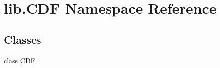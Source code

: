 \hypertarget{namespacelib_1_1_c_d_f}{\section{lib.\-C\-D\-F Namespace Reference}
\label{namespacelib_1_1_c_d_f}
}
\subsection*{Classes}
\begin{DoxyCompactItemize}
\item 
class \hyperlink{classlib_1_1_c_d_f_1_1_c_d_f}{C\-D\-F}
\end{DoxyCompactItemize}
